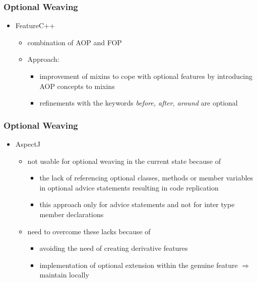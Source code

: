 \documentclass{beamer}
\begin{document}
\begin{frame}
\frametitle{Optional Weaving}
\begin{itemize}
 \item FeatureC++
	\begin{itemize}
		\item combination of AOP and FOP 
		\item Approach:
		\begin{itemize}
		\item improvement of mixins to cope with optional features by introducing AOP concepts to mixins
		\item refinements with the keywords \emph{before, after, around} are optional
		\end{itemize}

	\end{itemize}
	\end{itemize}
\end{frame}

\begin{frame}
\frametitle{Optional Weaving}
\begin{itemize}
 \item AspectJ
	\begin{itemize}
		\item not usable for optional weaving in the current state because of
\begin{itemize}
 \item the lack of referencing optional classes, methods or member variables in optional advice statements resulting in code replication
\item this approach only for advice statements and not for inter type member declarations 
\end{itemize}
\pause
\item need to overcome these lacks because of
\begin{itemize}
 \item avoiding the need of creating derivative features
\item implementation of optional extension within the genuine feature $\Rightarrow$ maintain locally
\end{itemize}


	\end{itemize}
\end{itemize}
\end{frame}
\end{document}

